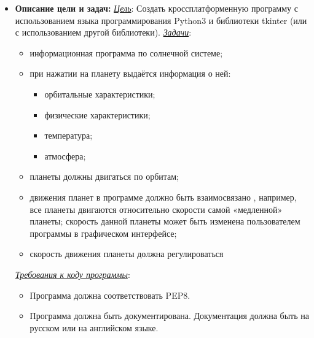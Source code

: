 \documentclass[14pt, oneside]{altsu-report}
\begin{document}
\begin{itemize}
    \item \textbf{Описание цели и задач: \newline}
\underline{\textit{Цель}}: Создать кроссплатформенную программу с использованием языка программирования Python3 и библиотеки tkinter (или с использованием другой библиотеки). \newline
\underline{\textit{Задачи}}:

    \begin{itemize}
        \item информационная программа по солнечной системе;
        \item при нажатии на планету выдаётся информация о ней:
            \begin{itemize}
                \item орбитальные характеристики;
                \item физические характеристики;
                \item температура;
                \item атмосфера;
            \end{itemize}
        \item планеты должны двигаться по орбитам;
        \item движения планет в программе должно быть взаимосвязано , например, все планеты двигаются относительно скорости самой «медленной» планеты; скорость данной планеты может быть изменена пользователем программы в графическом интерфейсе;
        \item скорость движения планеты должна регулироваться
    \end{itemize}

\underline{\textit{Требования к коду программы}}:
    \begin{itemize}
        \item Программа должна соответствовать PEP8.
        \item Программа должна быть документирована. Документация должна быть на русском или на английском языке.
    \end{itemize}


\end{itemize}
\end{document}
